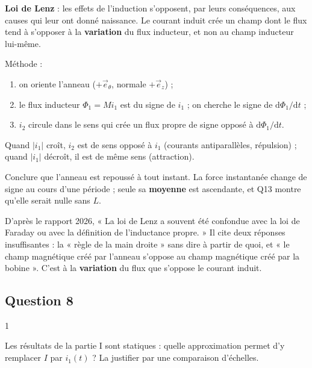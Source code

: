 \documentclass[11pt,a4paper]{article}
\providecommand{\tightlist}{\setlength{\itemsep}{0pt}\setlength{\parskip}{0pt}}
\begin{document}
\textbf{Loi de Lenz} : les effets de l'induction s'opposent, par leurs conséquences, aux causes qui leur ont donné naissance. Le courant induit crée un champ dont le flux tend à s'opposer à la \textbf{variation} du flux inducteur, et non au champ inducteur lui-même.

Méthode :

\begin{enumerate}
\def\labelenumi{\arabic{enumi}.}
\tightlist
\item
  on oriente l'anneau (\(+\vec e_\theta\), normale \(+\vec e_z\)) ;
\item
  le flux inducteur \(\Phi_1=Mi_1\) est du signe de \(i_1\) ; on cherche le signe de \(\mathrm d\Phi_1/\mathrm dt\) ;
\item
  \(i_2\) circule dans le sens qui crée un flux propre de signe opposé à \(\mathrm d\Phi_1/\mathrm dt\).
\end{enumerate}

Quand \(|i_1|\) croît, \(i_2\) est de sens opposé à \(i_1\) (courants antiparallèles, répulsion) ; quand \(|i_1|\) décroît, il est de même sens (attraction).

\begin{piege}

Conclure que l'anneau est repoussé à tout instant. La force instantanée change de signe au cours d'une période ; seule sa \textbf{moyenne} est ascendante, et Q13 montre qu'elle serait nulle sans \(L\).

\end{piege}

\begin{jury}

D'après le rapport 2026, « La loi de Lenz a souvent été confondue avec la loi de Faraday ou avec la définition de l'inductance propre. » Il cite deux réponses insuffisantes : la « règle de la main droite » sans dire à partir de quoi, et « le champ magnétique créé par l'anneau s'oppose au champ magnétique créé par la bobine ». C'est à la \textbf{variation} du flux que s'oppose le courant induit.

\end{jury}

\hypertarget{question-8}{%
\subsection{Question 8}\label{question-8}}

\begin{indication}{1}

Les résultats de la partie I sont statiques : quelle approximation permet d'y remplacer \(I\) par \(i_1(t)\) ? La justifier par une comparaison d'échelles.

\end{indication}
\end{document}
